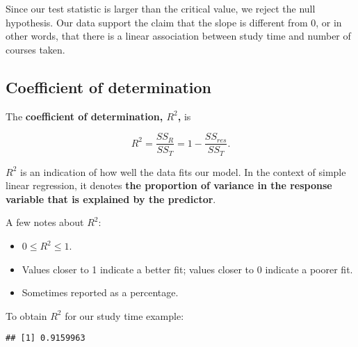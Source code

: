 \documentclass[
]{book}
\newenvironment{Shaded}{\begin{snugshade}}{\end{snugshade}}
\newcommand{\DecValTok}[1]{\textcolor[rgb]{0.00,0.00,0.81}{#1}}
\newcommand{\DocumentationTok}[1]{\textcolor[rgb]{0.56,0.35,0.01}{\textbf{\textit{#1}}}}
\newcommand{\FunctionTok}[1]{\textcolor[rgb]{0.13,0.29,0.53}{\textbf{#1}}}
\newcommand{\NormalTok}[1]{#1}
\newcommand{\OtherTok}[1]{\textcolor[rgb]{0.56,0.35,0.01}{#1}}
\newcommand{\SpecialCharTok}[1]{\textcolor[rgb]{0.81,0.36,0.00}{\textbf{#1}}}
\newcommand{\StringTok}[1]{\textcolor[rgb]{0.31,0.60,0.02}{#1}}
\providecommand{\tightlist}{%
  \setlength{\itemsep}{0pt}\setlength{\parskip}{0pt}}
\begin{document}
Since our test statistic is larger than the critical value, we reject the null hypothesis. Our data support the claim that the slope is different from 0, or in other words, that there is a linear association between study time and number of courses taken.

\hypertarget{coefficient-of-determination}{%
\subsection{Coefficient of determination}\label{coefficient-of-determination}}

The \textbf{coefficient of determination, \(R^2\),} is

\begin{equation}
R^{2} = \frac{SS_R}{SS_T} = 1 - \frac{SS_{res}}{SS_T}.
\label{eq:R2}
\end{equation}

\(R^{2}\) is an indication of how well the data fits our model. In the context of simple linear regression, it denotes \textbf{the proportion of variance in the response variable that is explained by the predictor}.

A few notes about \(R^2\):

\begin{itemize}
\tightlist
\item
  \(0 \leq R^2 \leq 1\).
\item
  Values closer to 1 indicate a better fit; values closer to 0 indicate a poorer fit.
\item
  Sometimes reported as a percentage.
\end{itemize}

To obtain \(R^2\) for our study time example:

\begin{Shaded}
\end{Shaded}

\begin{verbatim}
## [1] 0.9159963
\end{verbatim}
\end{document}
